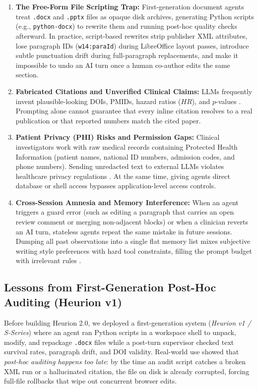 \documentclass[11pt,a4paper]{article}
\begin{document}
\begin{enumerate}[leftmargin=1.5em,itemsep=2pt]
  \item \textbf{The Free-Form File Scripting Trap:} First-generation document agents treat \texttt{.docx} and \texttt{.pptx} files as opaque disk archives, generating Python scripts (e.g., \texttt{python-docx}) to rewrite them and running post-hoc quality checks afterward. In practice, script-based rewrites strip publisher XML attributes, lose paragraph IDs (\texttt{w14:paraId}) during LibreOffice layout passes, introduce subtle punctuation drift during full-paragraph replacements, and make it impossible to undo an AI turn once a human co-author edits the same section.
  \item \textbf{Fabricated Citations and Unverified Clinical Claims:} LLMs frequently invent plausible-looking DOIs, PMIDs, hazard ratios ($HR$), and $p$-values \cite{ji2023survey,walters2023fabrication}. Prompting alone cannot guarantee that every inline citation resolves to a real publication or that reported numbers match the cited paper.
  \item \textbf{Patient Privacy (PHI) Risks and Permission Gaps:} Clinical investigators work with raw medical records containing Protected Health Information (patient names, national ID numbers, admission codes, and phone numbers). Sending unredacted text to external LLMs violates healthcare privacy regulations \cite{hipaa1996}. At the same time, giving agents direct database or shell access bypasses application-level access controls.
  \item \textbf{Cross-Session Amnesia and Memory Interference:} When an agent triggers a guard error (such as editing a paragraph that carries an open review comment or merging non-adjacent blocks) or when a clinician reverts an AI turn, stateless agents repeat the same mistake in future sessions. Dumping all past observations into a single flat memory list mixes subjective writing style preferences with hard tool constraints, filling the prompt budget with irrelevant rules \cite{shinn2023reflexion,packer2023memgpt}.
\end{enumerate}

\subsection{Lessons from First-Generation Post-Hoc Auditing (Heurion v1)}
Before building Heurion 2.0, we deployed a first-generation system (\emph{Heurion v1 / S-Series}) where an agent ran Python scripts in a workspace shell to unpack, modify, and repackage \texttt{.docx} files while a post-turn supervisor checked text survival rates, paragraph drift, and DOI validity. Real-world use showed that \emph{post-hoc auditing happens too late}: by the time an audit script catches a broken XML run or a hallucinated citation, the file on disk is already corrupted, forcing full-file rollbacks that wipe out concurrent browser edits.
\end{document}
